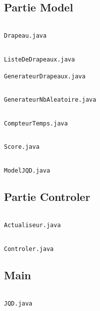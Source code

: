 \documentclass{article}
\begin{document}
\subsection{Partie Model}
\inputminted[frame=single]{java}{../encapsulation/Drapeau.java}
\begin{center} \texttt{Drapeau.java} \end{center}
\inputminted[frame=single]{java}{../encapsulation/ListeDeDrapeaux.java}
\begin{center} \texttt{ListeDeDrapeaux.java} \end{center}
	
\begin{center} \texttt{GenerateurDrapeaux.java} \end{center}
\inputminted[frame=single]{java}{../encapsulation/GenerateurNbAleatoire.java}
\begin{center} \texttt{GenerateurNbAleatoire.java} \end{center}
\inputminted[frame=single]{java}{../encapsulation/CompteurTemps.java}
\begin{center} \texttt{CompteurTemps.java} \end{center}
\inputminted[frame=single]{java}{../encapsulation/Score.java}
\begin{center} \texttt{Score.java} \end{center}
\inputminted[frame=single]{java}{../encapsulation/ModelJQD.java}
\begin{center} \texttt{ModelJQD.java} \end{center}

\subsection{Partie Controler}
\inputminted[frame=single]{java}{../encapsulation/Actualiseur.java}
\begin{center} \texttt{Actualiseur.java} \end{center}
\inputminted[frame=single]{java}{../encapsulation/ControlerJQD.java}
\begin{center} \texttt{Controler.java} \end{center}

\subsection{Main}
\inputminted[frame=single]{java}{../encapsulation/JQD.java}
\begin{center} \texttt{JQD.java} \end{center}
\end{document}
